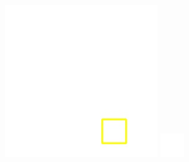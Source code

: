 \documentclass[10pt,UTF8,fntef]{ctexart}
\begin{document}
\begin{figure}[H]
{{\begin{minipage}[b]{0.15\linewidth}
            \includegraphics[width=1\linewidth]{../log/spoon3/cut/LC81321192014054LGN00_03249_mask.jpg}\vspace{4pt}
            \includegraphics[width=1\linewidth]{../log/spoon3/cut/tmp_cut_LC81321192014054LGN00_03249_mask.jpg}\vspace{4pt}

\end{minipage}}}
\end{figure}
\end{document}
